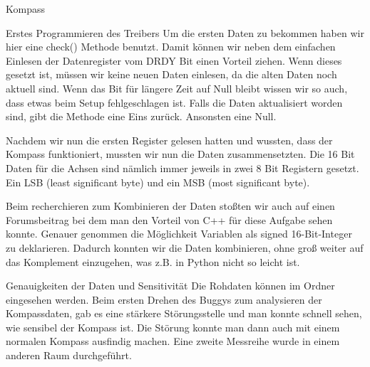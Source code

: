 \documentclass[12pt]{report}
\begin{document}
\begin{section}{Kompass}
\begin{subsection}{Erstes Programmieren des Treibers}
  Um die ersten Daten zu bekommen haben wir hier eine check() Methode benutzt. Damit können wir neben dem
  einfachen Einlesen der Datenregister vom DRDY Bit einen Vorteil ziehen. Wenn dieses gesetzt ist, müssen wir 
  keine neuen Daten einlesen, da die alten Daten noch aktuell sind. Wenn das Bit für längere Zeit auf Null bleibt
  wissen wir so auch, dass etwas beim Setup fehlgeschlagen ist.
  Falls die Daten aktualisiert worden sind, gibt die Methode eine Eins zurück. Ansonsten eine Null. 

  Nachdem wir nun die ersten Register gelesen hatten und wussten, dass der Kompass funktioniert, mussten wir nun die Daten 
  zusammensetzten. Die 16 Bit Daten für die Achsen sind nämlich immer jeweils in zwei 8 Bit Registern gesetzt. Ein 
  LSB (least significant byte) und ein MSB (most significant byte).
  
  Beim recherchieren zum Kombinieren der Daten stoßten wir auch auf einen Forumsbeitrag\cite{forumMagnet}
  bei dem man den Vorteil von C++ für diese Aufgabe sehen konnte. Genauer genommen die 
  Möglichkeit Variablen als signed 16-Bit-Integer zu deklarieren. Dadurch konnten wir die Daten kombinieren, ohne 
  groß weiter auf das Komplement einzugehen, was z.B. in Python nicht so leicht ist.
  \end{subsection}
  \begin{subsection}{Genauigkeiten der Daten und Sensitivität}
  Die Rohdaten können im Ordner  eingesehen werden.
  Beim ersten Drehen des Buggys zum analysieren der Kompassdaten, gab es eine stärkere Störungsstelle und man 
  konnte schnell sehen, wie sensibel der Kompass ist. Die Störung konnte man dann auch mit einem normalen Kompass 
  ausfindig machen.
  Eine zweite Messreihe wurde in einem anderen Raum durchgeführt.


\end{subsection}
\end{section}
\end{document}
